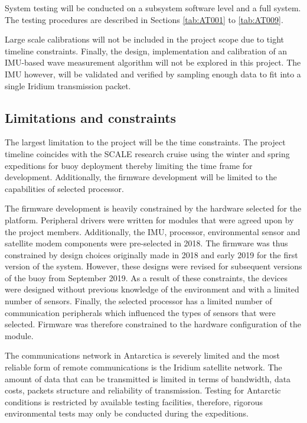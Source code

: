 System testing will be conducted on a subsystem software level and a full system. The testing procedures are described in Sections  \ref{tab:AT001} to \ref{tab:AT009}. 

Large scale calibrations will not be included in the project scope due to tight timeline constraints. Finally, the  design, implementation and calibration of an IMU-based wave measurement algorithm will not be explored in this project. The IMU however, will be validated and verified by sampling enough data to fit into a single Iridium transmission packet. 

\subsection{Limitations and constraints}

The largest limitation to the project will be the time constraints. The project timeline coincides with the SCALE research cruise using the winter and spring expeditions for buoy deployment thereby limiting the time frame for development. Additionally, the firmware development will be limited to the capabilities of selected processor. \par 

The firmware development is heavily constrained by the hardware selected for the platform. Peripheral drivers were written for modules that were agreed upon by the project members. Additionally, the IMU, processor, environmental sensor and satellite modem components were pre-selected in 2018. The firmware was thus constrained by design choices originally made in 2018 and early 2019 for the first version of the system. However, these designs were revised for subsequent versions of the buoy from September 2019. As a result of these constraints, the devices were designed without previous knowledge of the environment and with a limited number of sensors.  Finally, the selected processor has a limited number of communication peripherals which influenced the types of sensors that were selected. Firmware was therefore constrained to the hardware configuration of the module.

The communications network in Antarctica is severely limited and the most reliable form of remote communications is the Iridium satellite network. The amount of data that can be transmitted is limited in terms of bandwidth, data costs, packets structure and reliability of transmission. Testing for Antarctic conditions is restricted by available testing facilities, therefore, rigorous environmental tests may only be conducted during the expeditions.\par 

